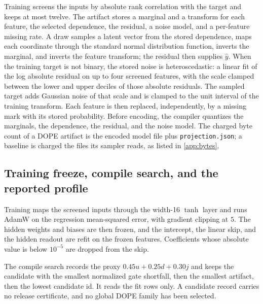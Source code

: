 \documentclass{article}
\begin{document}
Training screens the inputs by absolute rank correlation with the target and keeps at most twelve. The artifact stores a marginal and a transform for each feature, the selected dependence, the residual, a noise model, and a per-feature missing rate. A draw samples a latent vector from the stored dependence, maps each coordinate through the standard normal distribution function, inverts the marginal, and inverts the feature transform; the residual then supplies $\hat{y}$. When the training target is not binary, the stored noise is heteroscedastic: a linear fit of the log absolute residual on up to four screened features, with the scale clamped between the lower and upper deciles of those absolute residuals. The sampled target adds Gaussian noise of that scale and is clamped to the unit interval of the training transform. Each feature is then replaced, independently, by a missing mark with its stored probability. Before encoding, the compiler quantizes the marginals, the dependence, the residual, and the noise model. The charged byte count of a DOPE artifact is the encoded model file plus \texttt{projection.json}; a baseline is charged the files its sampler reads, as listed in \cref{app:bytes}.

\subsection{Training freeze, compile search, and the reported profile}
\label{app:compile}
Training maps the screened inputs through the width-16 $\tanh$ layer and runs AdamW on the regression mean-squared error, with gradient clipping at $5$. The hidden weights and biases are then frozen, and the intercept, the linear skip, and the hidden readout are refit on the frozen features. Coefficients whose absolute value is below $10^{-5}$ are dropped from the skip.

The compile search records the proxy $0.45u + 0.25d + 0.30j$ and keeps the candidate with the smallest normalized gate shortfall, then the smallest artifact, then the lowest candidate id. It reads the fit rows only. A candidate record carries no release certificate, and no global DOPE family has been selected.
\end{document}
